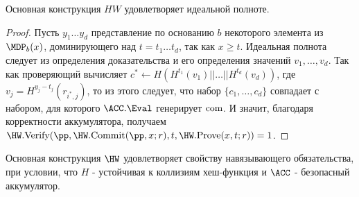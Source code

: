 \begin{theorem}
	\label{lemma:4}
	Основная конструкция $HW$ удовлетворяет идеальной полноте.
\end{theorem}

\begin{proof}
	Пусть $y_1 \dots y_d$ представление по основанию $b$ некоторого элемента из $\MDP_b(x)$, доминирующего над $t = t_1 \dots t_d$, так как $x \geq t$.
	Идеальная полнота следует из определения доказательства и его определения значений $v_1, \dots, v_d$.
	Так как проверяющий вычисляет $c^* \leftarrow H(H^{t_1}(v_1) || \dots || H^{t_d}(v_d))$, где $v_j = H^{y_j - t_j}(r_{i^*, j})$, то из этого следует, что набор $\{c_1, \dots, c_d\}$ совпадает с набором, для которого $\ACC.\Eval$ генерирует $\text{com}$.
	И значит, благодаря корректности аккумулятора, получаем $\HW.\Verify(\pp, \HW.\Commit(\pp, x; r), t, \HW.\Prove(x, t; r)) = 1$.
\end{proof}

\begin{theorem}
	\label{lemma:5}
	Основная конструкция $\HW$ удовлетворяет свойству навязывающего обязательства, при условии, что $H$ - устойчивая к коллизиям хеш-функция и $\ACC$ - безопасный аккумулятор.
\end{theorem}

